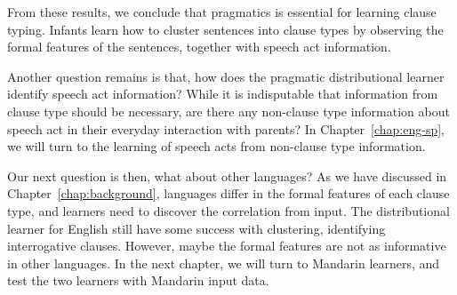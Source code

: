 From these results, we conclude that pragmatics is essential for learning clause typing. Infants learn how to cluster sentences into clause types by observing the formal features of the sentences, together with speech act information.


Another question remains is that, how does the pragmatic distributional learner identify speech act information? While it is indisputable that information from clause type should be necessary, are there any non-clause type information about speech act in their everyday interaction with parents? In Chapter~\ref{chap:eng-sp}, we will turn to the learning of speech acts from non-clause type information.


Our next question is then, what about other languages? As we have discussed in Chapter~\ref{chap:background}, languages differ in the formal features of each clause type, and learners need to discover the correlation from input. The distributional learner for English still have some success with clustering, identifying interrogative clauses. However, maybe the formal features are not as informative in other languages. In the next chapter, we will turn to Mandarin learners, and test the two learners with Mandarin input data. 
